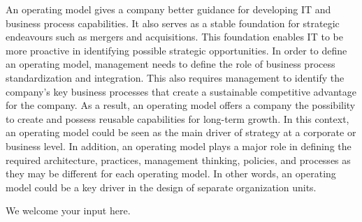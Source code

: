 An operating model gives a company better guidance for developing IT and business process capabilities.
It also serves as a stable foundation for strategic endeavours such as mergers and acquisitions.
This foundation enables IT to be more proactive in identifying possible strategic opportunities.
In order to define an operating model, management needs to define the role of business process standardization
and integration.
This also requires management to identify the company’s key business processes that create a
sustainable competitive advantage for the company.
As a result, an operating model offers a company the possibility to create and possess reusable capabilities
for long-term growth.
In this context, an operating model could be seen as the main driver of strategy at a corporate or business level.
In addition, an operating model plays a major role in defining the required architecture, practices,
management thinking, policies, and processes as they may be different for each operating model.
In other words, an operating model could be a key driver in the design of separate organization units.

\ekgmmContextSection

We welcome your input here.
